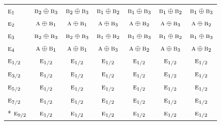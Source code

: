 \documentclass[10pt,a4paper]{article}
\numberwithin{equation}{section}
\newcommand{\irr}[1]{\text{\normalfont\scshape #1}}
\begin{document}
{\begin{longtable}{@{}lcccccc@{}}
$\irr{e}_{1}$ & $\irr{b}_{2}\oplus \irr{b}_{3}$ & $\irr{b}_{2}\oplus \irr{b}_{3}$ & $\irr{b}_{1}\oplus \irr{b}_{2}$ & $\irr{b}_{1}\oplus \irr{b}_{3}$ & $\irr{b}_{1}\oplus \irr{b}_{2}$ & $\irr{b}_{1}\oplus \irr{b}_{3}$\\
$\irr{e}_{2}$ & $\irr{a}\oplus \irr{b}_{1}$ & $\irr{a}\oplus \irr{b}_{1}$ & $\irr{a}\oplus \irr{b}_{3}$ & $\irr{a}\oplus \irr{b}_{2}$ & $\irr{a}\oplus \irr{b}_{3}$ & $\irr{a}\oplus \irr{b}_{2}$\\
$\irr{e}_{3}$ & $\irr{b}_{2}\oplus \irr{b}_{3}$ & $\irr{b}_{2}\oplus \irr{b}_{3}$ & $\irr{b}_{1}\oplus \irr{b}_{2}$ & $\irr{b}_{1}\oplus \irr{b}_{3}$ & $\irr{b}_{1}\oplus \irr{b}_{2}$ & $\irr{b}_{1}\oplus \irr{b}_{3}$\\
$\irr{e}_{4}$ & $\irr{a}\oplus \irr{b}_{1}$ & $\irr{a}\oplus \irr{b}_{1}$ & $\irr{a}\oplus \irr{b}_{3}$ & $\irr{a}\oplus \irr{b}_{2}$ & $\irr{a}\oplus \irr{b}_{3}$ & $\irr{a}\oplus \irr{b}_{2}$\\
$\irr{e}_{1/2}$ & $\irr{e}_{1/2}$ & $\irr{e}_{1/2}$ & $\irr{e}_{1/2}$ & $\irr{e}_{1/2}$ & $\irr{e}_{1/2}$ & $\irr{e}_{1/2}$\\
$\irr{e}_{3/2}$ & $\irr{e}_{1/2}$ & $\irr{e}_{1/2}$ & $\irr{e}_{1/2}$ & $\irr{e}_{1/2}$ & $\irr{e}_{1/2}$ & $\irr{e}_{1/2}$\\
$\irr{e}_{5/2}$ & $\irr{e}_{1/2}$ & $\irr{e}_{1/2}$ & $\irr{e}_{1/2}$ & $\irr{e}_{1/2}$ & $\irr{e}_{1/2}$ & $\irr{e}_{1/2}$\\
$\irr{e}_{7/2}$ & $\irr{e}_{1/2}$ & $\irr{e}_{1/2}$ & $\irr{e}_{1/2}$ & $\irr{e}_{1/2}$ & $\irr{e}_{1/2}$ & $\irr{e}_{1/2}$\\*
$\irr{e}_{9/2}$ & $\irr{e}_{1/2}$ & $\irr{e}_{1/2}$ & $\irr{e}_{1/2}$ & $\irr{e}_{1/2}$ & $\irr{e}_{1/2}$ & $\irr{e}_{1/2}$\\
\bottomrule\end{longtable}}
\end{document}
